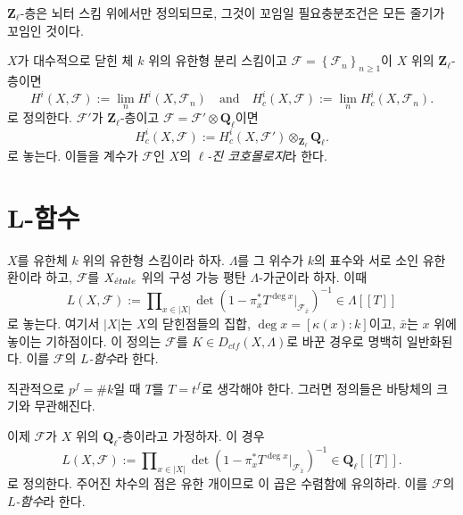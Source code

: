 \begin{remark}
\label{remark-torsion-stalks}
$\mathbf{Z}_\ell$-층은 뇌터 스킴 위에서만 정의되므로, 그것이 꼬임일
필요충분조건은 모든 줄기가 꼬임인 것이다.
\end{remark}

\begin{definition}
\label{definition-cohomology-l-adic}
$X$가 대수적으로 닫힌 체 $k$ 위의 유한형 분리 스킴이고
$\mathcal{F} = \left\{\mathcal{F}_n\right\}_{n\geq 1}$이 $X$ 위의
$\mathbf{Z}_\ell$-층이면
$$
H^i(X, \mathcal{F}) := \lim_n H^i(X, \mathcal{F}_n)
\quad\text{and}\quad
H_c^i(X, \mathcal{F}) := \lim_n H_c^i(X, \mathcal{F}_n).
$$
로 정의한다. $\mathcal{F}'$가 $\mathbf{Z}_\ell$-층이고
$\mathcal{F} = \mathcal{F}'\otimes \mathbf{Q}_\ell$이면
$$
H_c^i(X , \mathcal{F}) := H_c^i(X,
\mathcal{F}')\otimes_{\mathbf{Z}_\ell}\mathbf{Q}_\ell.
$$
로 놓는다. 이들을 계수가 $\mathcal{F}$인 $X$의
{\it $\ell$-진 코호몰로지}라 한다.
\end{definition}





\section{L-함수}
\label{section-L-function}

\begin{definition}
\label{definition-L-function-finite-ring}
$X$를 유한체 $k$ 위의 유한형 스킴이라 하자. $\Lambda$를 그 위수가
$k$의 표수와 서로 소인 유한환이라 하고, $\mathcal{F}$를
$X_{\acute{e}tale}$ 위의 구성 가능 평탄 $\Lambda$-가군이라 하자. 이때
$$
L(X, \mathcal{F}) :=
\prod\nolimits_{x\in |X|}
\det(1 - \pi_x^*T^{\deg x} |_{\mathcal{F}_{\bar x}})^{-1} \in \Lambda [[ T ]]
$$
로 놓는다. 여기서 $|X|$는 $X$의 닫힌점들의 집합,
$\deg x = [\kappa(x): k]$이고, $\bar x$는 $x$ 위에 놓이는 기하점이다.
이 정의는 $\mathcal{F}$를 $K \in D_{ctf}(X, \Lambda)$로 바꾼 경우로
명백히 일반화된다. 이를 $\mathcal{F}$의 {\it $L$-함수}라 한다.
\end{definition}

\begin{remark}
\label{remark-T}
직관적으로 $p^f = \# k$일 때 $T$를 $T = t^f$로 생각해야 한다.
그러면 정의들은 바탕체의 크기와 무관해진다.
\end{remark}

\begin{definition}
\label{definition-L-function-l-adic}
이제 $\mathcal{F}$가 $X$ 위의 $\mathbf{Q}_\ell$-층이라고 가정하자.
이 경우
$$
L(X, \mathcal{F}) :=
\prod\nolimits_{x \in |X|}
\det(1 - \pi_x^*T^{\deg x} |_{\mathcal{F}_{\bar x}})^{-1}
\in \mathbf{Q}_\ell[[T]].
$$
로 정의한다. 주어진 차수의 점은 유한 개이므로 이 곱은 수렴함에
유의하라. 이를 $\mathcal{F}$의 {\it $L$-함수}라 한다.
\end{definition}




